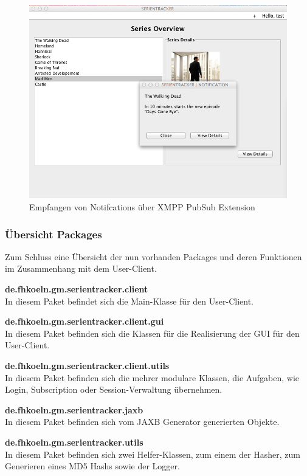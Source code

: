 \begin{figure}[H]
\includegraphics[width=1\textwidth]{../images/screenshots/client-notification.png}
\caption{Empfangen von Notifcations über XMPP PubSub Extension}
\label{notification}
\end{figure}

\newpage

\subsubsection{Übersicht Packages}

Zum Schluss eine Übersicht der nun vorhanden Packages und deren Funktionen im Zusammenhang mit dem User-Client.


\textbf{de.fhkoeln.gm.serientracker.client}\\
In diesem Paket befindet sich die Main-Klasse für den User-Client.

\textbf{de.fhkoeln.gm.serientracker.client.gui}\\
In diesem Paket befinden sich die Klassen für die Realisierung der GUI für den User-Client.

\textbf{de.fhkoeln.gm.serientracker.client.utils}\\
In diesem Paket befinden sich die mehrer modulare Klassen, die Aufgaben, wie Login, Subscription oder Session-Verwaltung übernehmen.

\textbf{de.fhkoeln.gm.serientracker.jaxb}\\
In diesem Paket befinden sich vom JAXB Generator generierten Objekte.

\textbf{de.fhkoeln.gm.serientracker.utils}\\
In diesem Paket befinden sich zwei Helfer-Klassen, zum einem der Hasher, zum Generieren eines MD5 Hashs sowie der Logger.

